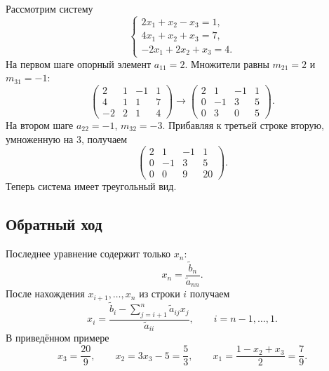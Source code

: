 \documentclass[../final.tex]{subfiles}
\begin{document}
Рассмотрим систему
\begin{equation*}
    \begin{cases}
        2x_1+x_2-x_3=1,\\
        4x_1+x_2+x_3=7,\\
        -2x_1+2x_2+x_3=4.
    \end{cases}
\end{equation*}
На первом шаге опорный элемент $a_{11}=2$.
Множители равны $m_{21}=2$ и $m_{31}=-1$:
\begin{equation*}
    \left(\begin{array}{rrr|r}
        2&1&-1&1\\
        4&1&1&7\\
        -2&2&1&4
    \end{array}\right)
    \longrightarrow
    \left(\begin{array}{rrr|r}
        2&1&-1&1\\
        0&-1&3&5\\
        0&3&0&5
    \end{array}\right).
\end{equation*}
На втором шаге $a_{22}=-1$, $m_{32}=-3$. Прибавляя к третьей
строке вторую, умноженную на $3$, получаем
\begin{equation*}
    \left(\begin{array}{rrr|r}
        2&1&-1&1\\
        0&-1&3&5\\
        0&0&9&20
    \end{array}\right).
\end{equation*}
Теперь система имеет треугольный вид.

\subsection{Обратный ход}

Последнее уравнение содержит только $x_n$:
\begin{equation*}
    x_n=\frac{\widetilde b_n}{\widetilde a_{nn}}.
\end{equation*}
После нахождения $x_{i+1},\ldots,x_n$ из строки $i$ получаем
\begin{equation*}
    x_i=\frac{\widetilde b_i-
        \displaystyle\sum_{j=i+1}^{n}\widetilde a_{ij}x_j}
        {\widetilde a_{ii}},\qquad i=n-1,\ldots,1.
\end{equation*}
В приведённом примере
\begin{equation*}
    x_3=\frac{20}{9},\qquad
    x_2=3x_3-5=\frac53,\qquad
    x_1=\frac{1-x_2+x_3}{2}=\frac79.
\end{equation*}
\end{document}
